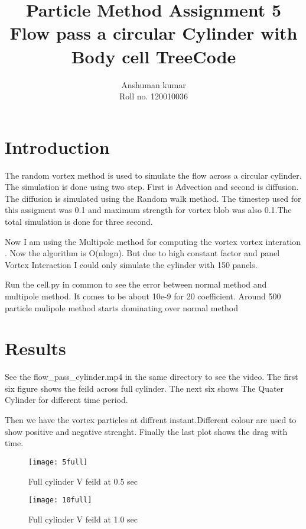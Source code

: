 \documentclass[12pt]{article}
\title {Particle Method Assignment 5 \\
Flow pass a circular Cylinder with Body cell TreeCode}
\author {Anshuman kumar \\
Roll no.  120010036}
\begin{document}
\maketitle

\section{Introduction}
The random vortex method is used to simulate the flow across a circular cylinder. 
The simulation is done using two step. First is Advection and second is diffusion.
The diffusion is simulated using the Random walk method. The timestep used
for this assigment was 0.1 and maximum strength for vortex blob was also 
0.1.The total simulation is done for three second.

Now I am using the Multipole method for computing the vortex vortex interation . Now the algorithm is O(nlogn). 
But due to high constant factor and panel Vortex Interaction I could only simulate the cylinder with 150 panels. 

Run the cell.py in common to see the error between normal method and multipole method. It comes to be about 10e-9 for 20 coefficient. Around 500
particle mulipole method starts dominating over normal method

\section{Results}
See the flow\_pass\_cylinder.mp4 in the same directory to see the video.
The first six figure shows the feild across full cylinder. The next six shows
The Quater Cylinder for different time period.

Then we have the vortex particles 
at diffrent instant.Different colour are used to show positive and negative strenght. Finally the last plot shows the drag with time.
\begin{figure}
\centering
\begin{minipage}{.5\textwidth}
  \centering
  \texttt{[image: 5full]}
  \captionsetup{width=0.8\textwidth}
  \caption{Full cylinder V feild at 0.5 sec} 
\end{minipage}%
\begin{minipage}{.5\textwidth}
  \centering
  \texttt{[image: 10full]}
  \captionsetup{width=0.8\textwidth}
  \caption{Full cylinder V feild at 1.0 sec} 
\end{minipage}
\end{figure}
\end{document}
